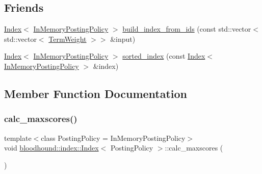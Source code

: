 \subsection*{Friends}
\begin{DoxyCompactItemize}
\item 
\mbox{\hyperlink{classbloodhound_1_1index_1_1Index}{Index}}$<$ \mbox{\hyperlink{classbloodhound_1_1index_1_1InMemoryPostingPolicy}{In\+Memory\+Posting\+Policy}} $>$ \mbox{\hyperlink{classbloodhound_1_1index_1_1Index_a0343a97c005a2df437a955c308d376e6}{build\+\_\+index\+\_\+from\+\_\+ids}} (const std\+::vector$<$ std\+::vector$<$ \mbox{\hyperlink{structbloodhound_1_1TermWeight}{Term\+Weight}} $>$$>$ \&input)
\item 
\mbox{\hyperlink{classbloodhound_1_1index_1_1Index}{Index}}$<$ \mbox{\hyperlink{classbloodhound_1_1index_1_1InMemoryPostingPolicy}{In\+Memory\+Posting\+Policy}} $>$ \mbox{\hyperlink{classbloodhound_1_1index_1_1Index_aad81f0929f0b03479f3361a23d96573b}{sorted\+\_\+index}} (const \mbox{\hyperlink{classbloodhound_1_1index_1_1Index}{Index}}$<$ \mbox{\hyperlink{classbloodhound_1_1index_1_1InMemoryPostingPolicy}{In\+Memory\+Posting\+Policy}} $>$ \&index)
\end{DoxyCompactItemize}


\subsection{Member Function Documentation}
\mbox{\label{classbloodhound_1_1index_1_1Index_a00eb8ae8cf8f24430fe170095c4aa4d9}} 
\subsubsection{\texorpdfstring{calc\+\_\+maxscores()}{calc\_maxscores()}}
{\footnotesize\ttfamily template$<$class Posting\+Policy = In\+Memory\+Posting\+Policy$>$ \\
void \mbox{\hyperlink{classbloodhound_1_1index_1_1Index}{bloodhound\+::index\+::\+Index}}$<$ Posting\+Policy $>$\+::calc\+\_\+maxscores (\begin{DoxyParamCaption}{ }\end{DoxyParamCaption})\hspace{0.3cm}{\ttfamily [inline]}}

